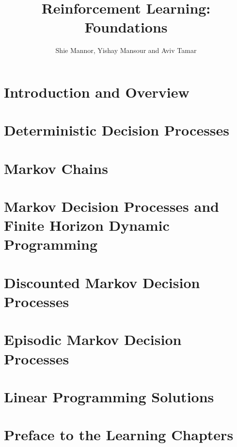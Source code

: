 \documentclass[12pt]{book}
\title{Reinforcement Learning: Foundations}
\date{October 2023
\\
  \textcolor{red}{This book is still work in progress. In particular, references to literature are not complete. We would be grateful for comments, suggestions, omissions, and errors of any kind, at \url{rlfoundationsbook@gmail.com}. }

\flushleft{Please cite as\\
\textcolor{blue}{
@book$\{$MannorMT-RLbook,\\
  url = $\{$https://sites.google.com/view/rlfoundations/home$\}$,\\
  author = $\{$Mannor, Shie and Mansour, Yishay and Tamar, Aviv$\}$,\\
  title = $\{$Reinforcement Learning:  Foundations$\}$,\\
  year = $\{$2023$\}$,\\
  publisher = $\{$-$\}$\\
$\}$\\
}
}

}
\author{Shie Mannor, Yishay Mansour and Aviv Tamar}
\begin{document}
\maketitle

\tableofcontents



\chapter{Introduction and Overview}
\label{chapter:intro}


\chapter{Deterministic Decision Processes}
\label{chapter:DDP}


\chapter{Markov Chains}
\label{chapter:MC}


\chapter{Markov Decision Processes and Finite Horizon Dynamic Programming}
\label{chapter:MDP-FH}


\chapter{Discounted Markov Decision Processes}
\label{chapter:disc}

\chapter*{Episodic Markov Decision Processes}


\chapter{Linear Programming Solutions}\label{chapter-LP}


\chapter{Preface to the Learning Chapters}\label{chapter-learning-preface}

\end{document}
